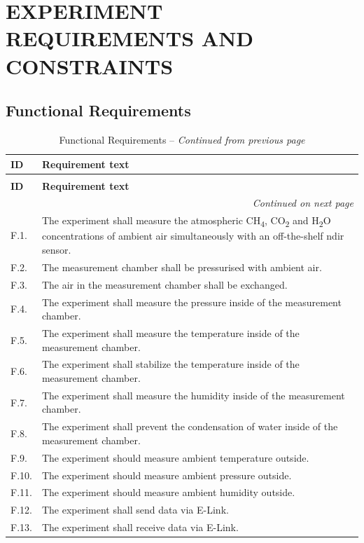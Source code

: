\documentclass[
  a4paper,
  11pt,
  openany,
  parskip,
  toc=totoc,
  listof=totoc,
  bibliography=totoc
]{scrreprt}
\begin{document}
\clearpage
\newpage

\chapter{EXPERIMENT REQUIREMENTS AND CONSTRAINTS}
\label{sec:requirements}
\section{Functional Requirements}

\begin{longtable}{|p{2cm}|p{12cm}|}
\caption{Functional Requirements} \\
\hline 
\textbf{ID} & \textbf{Requirement text} \\
\hline 
\endfirsthead
\caption[]{Functional Requirements -- \textit{Continued from previous page}} \\
\hline
\textbf{ID} & \textbf{Requirement text} \\
\hline
\endhead
\hline
\multicolumn{2}{r}{\textit{Continued on next page}} \\
\endfoot
\hline
\endlastfoot
F.1. & The experiment shall measure the atmospheric CH\textsubscript{4}, CO\textsubscript{2} and H\textsubscript{2}O concentrations of ambient air simultaneously with an off-the-shelf \gls{ndir} sensor. \\
\hline
F.2. & The measurement chamber shall be pressurised with ambient air. \\
\hline
F.3. & The air in the measurement chamber shall be exchanged. \\
\hline
F.4. & The experiment shall measure the pressure inside of the measurement chamber. \\
\hline
F.5. & The experiment shall measure the temperature inside of the measurement chamber. \\
\hline
F.6. & The experiment shall stabilize the temperature inside of the measurement chamber. \\
\hline
F.7. & The experiment shall measure the humidity inside of the measurement chamber. \\
\hline
F.8. & The experiment shall prevent the condensation of water inside of the measurement chamber. \\
\hline
F.9. & The experiment should measure ambient temperature outside. \\
\hline
F.10. & The experiment should measure ambient pressure outside. \\
\hline
F.11. & The experiment should measure ambient humidity outside. \\
\hline
F.12. & The experiment shall send data via E-Link. \\
\hline
F.13. & The experiment shall receive data via E-Link. \\
\end{longtable}
\end{document}
